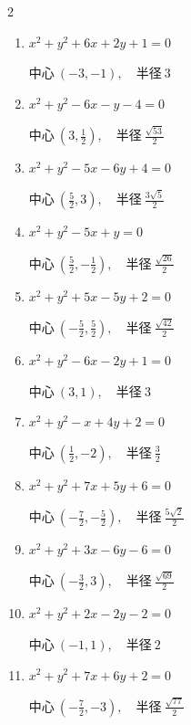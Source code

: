 \begin{multicols}{2}
\begin{enumerate}
  \item $x^{2}+y^{2}+6x+2y+1=0$

        $\displaystyle 中心\: \left(-3,-1\right), \quad 半径 \ 3$

  \item $x^{2}+y^{2}-6x-y-4=0$

        $\displaystyle 中心\: \left(3,\frac{1}{2}\right), \quad 半径 \ \frac{\sqrt{53}}{2}$

  \item $x^{2}+y^{2}-5x-6y+4=0$

        $\displaystyle 中心\: \left(\frac{5}{2},3\right), \quad 半径 \ \frac{3\sqrt{5}}{2}$

\columnbreak %

  \item $x^{2}+y^{2}-5x+y=0$

        $\displaystyle 中心\: \left(\frac{5}{2},-\frac{1}{2}\right), \quad 半径 \ \frac{\sqrt{26}}{2}$

  \item $x^{2}+y^{2}+5x-5y+2=0$

        $\displaystyle 中心\: \left(-\frac{5}{2},\frac{5}{2}\right), \quad 半径 \ \frac{\sqrt{42}}{2}$

  \item $x^{2}+y^{2}-6x-2y+1=0$

        $\displaystyle 中心\: \left(3,1\right), \quad 半径 \ 3$

  \item $x^{2}+y^{2}-x+4y+2=0$

        $\displaystyle 中心\: \left(\frac{1}{2},-2\right), \quad 半径 \ \frac{3}{2}$

  \item $x^{2}+y^{2}+7x+5y+6=0$

        $\displaystyle 中心\: \left(-\frac{7}{2},-\frac{5}{2}\right), \quad 半径 \ \frac{5\sqrt{2}}{2}$

  \item $x^{2}+y^{2}+3x-6y-6=0$

        $\displaystyle 中心\: \left(-\frac{3}{2},3\right), \quad 半径 \ \frac{\sqrt{69}}{2}$

  \item $x^{2}+y^{2}+2x-2y-2=0$

        $\displaystyle 中心\: \left(-1,1\right), \quad 半径 \ 2$

  \item $x^{2}+y^{2}+7x+6y+2=0$

        $\displaystyle 中心\: \left(-\frac{7}{2},-3\right), \quad 半径 \ \frac{\sqrt{77}}{2}$


\end{enumerate}
\end{multicols}
